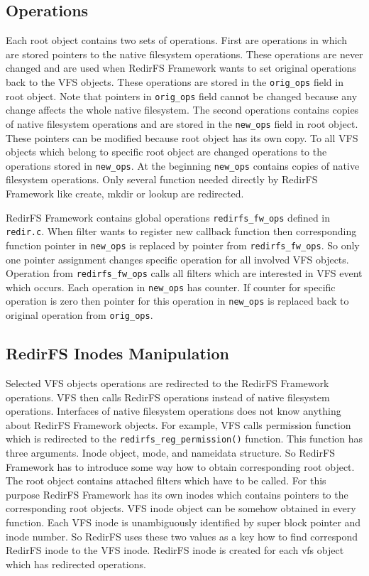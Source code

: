 \subsection{Operations}
Each root object contains two sets of operations. First are operations in which are
stored pointers to the native filesystem operations. These operations are
never changed and are used when RedirFS Framework wants to set original operations
back to the VFS objects. These operations are stored in the \texttt{orig\_ops} field
in root object. Note that pointers in \texttt{orig\_ops} field cannot be changed
because any change affects the whole native filesystem. The second operations contains copies
of native filesystem operations and are stored in the \texttt{new\_ops} field in
root object. These pointers can be modified because root object has its own copy. 
To all VFS objects which belong to specific root object are changed operations to the
operations stored in \texttt{new\_ops}. At the beginning \texttt{new\_ops} contains
copies of native filesystem operations. Only several function needed directly by RedirFS
Framework like create, mkdir or lookup are redirected.

RedirFS Framework contains global operations \texttt{redirfs\_fw\_ops} defined in
\texttt{redir.c}. When filter wants to register new callback function then
corresponding function pointer in \texttt{new\_ops} is replaced by pointer
from \texttt{redirfs\_fw\_ops}. So only one pointer assignment changes
specific operation for all involved VFS objects. Operation from
\texttt{redirfs\_fw\_ops} calls all filters which are interested in VFS event which
occurs. Each operation in \texttt{new\_ops} has counter. If counter for specific
operation is zero then pointer for this operation in \texttt{new\_ops} is replaced
back to original operation from \texttt{orig\_ops}.

\subsection{RedirFS Inodes Manipulation}
Selected VFS objects operations are redirected to the RedirFS Framework operations.
VFS then calls RedirFS operations instead of native
filesystem operations. Interfaces of native filesystem operations does not know anything
about RedirFS Framework objects. For example, VFS calls permission function which is
redirected to the \texttt{redirfs\_reg\_permission()} function. This function has
three arguments. Inode object, mode, and nameidata structure. So RedirFS Framework has
to introduce some way how to obtain corresponding root object. The root object contains
attached filters which have to be called. For this purpose RedirFS Framework has its
own inodes which contains pointers to the corresponding root objects. VFS inode object
can be somehow obtained in every function. Each VFS inode is unambiguously identified
by super block pointer and inode number. So RedirFS uses these two values as a key
how to find correspond RedirFS inode to the VFS inode. RedirFS inode is created
for each vfs object which has redirected operations.

